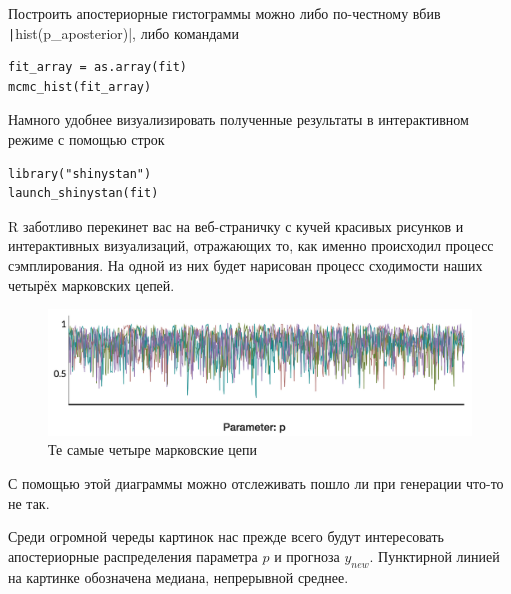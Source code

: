 \documentclass[12pt, a4paper, oneside]{extreport}
\theoremstyle{plain}              %
\theoremstyle{definition}         %
\begin{document}
Построить апостериорные гистограммы можно либо по-честному вбив  \texttt|hist(p_aposterior)|, либо командами
 
\begin{verbatim}
fit_array = as.array(fit)
mcmc_hist(fit_array)  
\end{verbatim}
 
Намного удобнее визуализировать полученные результаты в интерактивном режиме с помощью строк

\begin{verbatim} 
library("shinystan")
launch_shinystan(fit)
\end{verbatim}

R заботливо перекинет вас на веб-страничку с кучей красивых рисунков и интерактивных визуализаций, отражающих то, как именно происходил процесс сэмплирования. На одной из них будет нарисован процесс сходимости наших четырёх марковских цепей. 

  \begin{figure}[H]
 	\begin{center}
 		\includegraphics[scale=0.3]{markov_coin.png}
 		\caption{Те самые четыре марковские цепи} 
 	\end{center}
 \end{figure}


С помощью этой диаграммы можно отслеживать пошло ли при генерации что-то не так. 


Среди огромной череды картинок нас прежде всего будут интересовать апостериорные распределения параметра $p$ и прогноза $y_{new}$. Пунктирной линией на картинке обозначена медиана, непрерывной среднее. 

\vspace{1cm}
\end{document}
